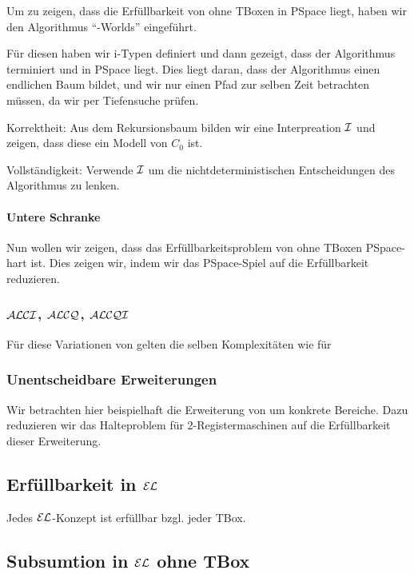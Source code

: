 Um zu zeigen, dass die Erfüllbarkeit von \ALC ohne TBoxen in PSpace liegt, haben wir den Algorithmus \enquote{\ALC-Worlds} eingeführt.

Für diesen haben wir i-Typen definiert und dann gezeigt, dass der Algorithmus terminiert und in PSpace liegt. Dies liegt daran, dass der Algorithmus einen endlichen Baum bildet, und wir nur einen Pfad zur selben Zeit betrachten müssen, da wir per Tiefensuche prüfen.

Korrektheit: Aus dem Rekursionsbaum bilden wir eine Interpreation $\mathcal{I}$ und zeigen, dass diese ein Modell von $C_0$ ist.

Vollständigkeit: Verwende $\mathcal{I}$ um die nichtdeterministischen Entscheidungen des Algorithmus zu lenken.

\paragraph{Untere Schranke}

Nun wollen wir zeigen, dass das Erfüllbarkeitsproblem von  \ALC ohne TBoxen PSpace-hart ist. Dies zeigen wir, indem wir das PSpace-Spiel auf die Erfüllbarkeit reduzieren. 

\subsubsection{\texorpdfstring{$\mathcal{A}\mathcal{L}\mathcal{C}\mathcal{I}$, $\mathcal{A}\mathcal{L}\mathcal{C}\mathcal{Q}$, $\mathcal{A}\mathcal{L}\mathcal{C}\mathcal{Q}\mathcal{I}$}{ALCI, ALCQ, ALCQI}}

Für diese Variationen von \ALC gelten die selben Komplexitäten wie für \ALC

\subsubsection{Unentscheidbare Erweiterungen}

Wir betrachten hier beispielhaft die Erweiterung von um konkrete Bereiche. Dazu reduzieren wir das Halteproblem für 2-Registermaschinen auf die Erfüllbarkeit dieser Erweiterung.

\subsection{Erfüllbarkeit in \texorpdfstring{$\mathcal{E}\mathcal{L}$}{EL}}

Jedes $\mathcal{E}\mathcal{L}$-Konzept ist erfüllbar bzgl. jeder TBox.

\subsection{Subsumtion in \texorpdfstring{$\mathcal{E}\mathcal{L}$}{EL} ohne TBox}

